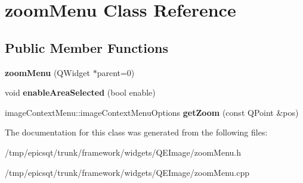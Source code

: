 \hypertarget{classzoomMenu}{
\section{zoomMenu Class Reference}
\label{classzoomMenu}
}
\subsection*{Public Member Functions}
\begin{DoxyCompactItemize}
\item 
\hypertarget{classzoomMenu_a65bdfff0d23f8792f2314b6b03d2b684}{
{\bfseries zoomMenu} (QWidget $\ast$parent=0)}
\label{classzoomMenu_a65bdfff0d23f8792f2314b6b03d2b684}

\item 
\hypertarget{classzoomMenu_a870249cc127c9f6225cfd345e9765254}{
void {\bfseries enableAreaSelected} (bool enable)}
\label{classzoomMenu_a870249cc127c9f6225cfd345e9765254}

\item 
\hypertarget{classzoomMenu_abb9e9e3f633e5d3b54c6df3277d72e37}{
imageContextMenu::imageContextMenuOptions {\bfseries getZoom} (const QPoint \&pos)}
\label{classzoomMenu_abb9e9e3f633e5d3b54c6df3277d72e37}

\end{DoxyCompactItemize}


The documentation for this class was generated from the following files:\begin{DoxyCompactItemize}
\item 
/tmp/epicsqt/trunk/framework/widgets/QEImage/zoomMenu.h\item 
/tmp/epicsqt/trunk/framework/widgets/QEImage/zoomMenu.cpp\end{DoxyCompactItemize}
